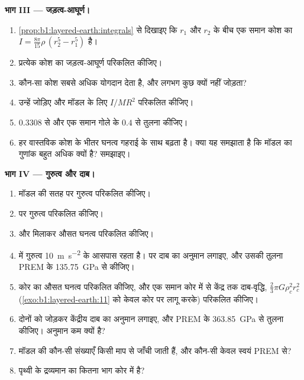 \begin{problem}
\noindent\textbf{भाग III --- जड़त्व-आघूर्ण।}
\begin{enumerate}[resume]
  \item \cref{prop:b1:layered-earth:integrals} से दिखाइए कि $r_1$ और $r_2$ के बीच एक समान कोश का $I = \tfrac{8\pi}{15}\rho\,(r_2^5 - r_1^5)$ है।
  \item प्रत्येक कोश का जड़त्व-आघूर्ण परिकलित कीजिए।
  \item कौन-सा कोश सबसे अधिक योगदान देता है, और  लगभग कुछ क्यों नहीं जोड़ता?
  \item उन्हें जोड़िए और मॉडल के लिए $I/MR^2$ परिकलित कीजिए।
  \item $0.3308$ से और एक समान गोले के $0.4$ से तुलना कीजिए।
  \item हर वास्तविक कोश के भीतर घनत्व गहराई के साथ बढ़ता है। क्या यह समझाता है कि मॉडल का गुणांक बहुत अधिक क्यों है? समझाइए।
\end{enumerate}

\noindent\textbf{भाग IV --- गुरुत्व और दाब।}
\begin{enumerate}[resume]
  \item मॉडल की सतह पर गुरुत्व परिकलित कीजिए।
  \item {} पर गुरुत्व परिकलित कीजिए।
  \item {} और  मिलाकर औसत घनत्व परिकलित कीजिए।
  \item {} में गुरुत्व \qty{10}{m.s^{-2}} के आसपास रहता है।  पर दाब का अनुमान लगाइए, और उसकी तुलना PREM के \qty{135.75}{GPa} से कीजिए।
  \item कोर का औसत घनत्व परिकलित कीजिए, और एक समान कोर में  से केंद्र तक दाब-वृद्धि, $\tfrac23\pi G\rho_c^2 r_c^2$ (\cref{exo:b1:layered-earth:11} को केवल कोर पर लागू करके) परिकलित कीजिए।
  \item दोनों को जोड़कर केंद्रीय दाब का अनुमान लगाइए, और PREM के \qty{363.85}{GPa} से तुलना कीजिए। अनुमान कम क्यों है?
  \item मॉडल की कौन-सी संख्याएँ किसी माप से जाँची जाती हैं, और कौन-सी केवल स्वयं PREM से?
  \item पृथ्वी के द्रव्यमान का कितना भाग कोर में है?
\end{enumerate}
\end{problem}
